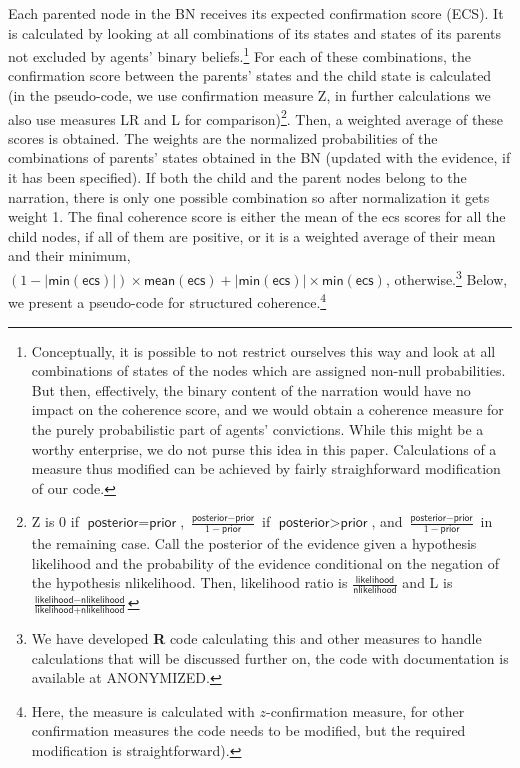 \documentclass[
  10pt,
]{scrartcl}
\newcommand{\s}[1]{\textsf{#1}}
\begin{document}
Each parented node in the BN receives its expected confirmation score (\s{ECS}). It is calculated by looking at all combinations of its states and states of its parents not excluded by agents' binary beliefs.\footnote{Conceptually, it is possible to not restrict ourselves this way and look at all combinations of states of the nodes which are assigned non-null probabilities. But then, effectively, the binary content of the narration would have no impact on the coherence score, and we would obtain a coherence measure for the purely probabilistic part of agents' convictions. While this might be a worthy enterprise, we do not purse this idea in this paper. Calculations of a measure thus modified can be achieved by fairly straighforward modification of our code.} For each of these combinations, the confirmation score between the parents' states and the child state is calculated (in the pseudo-code, we use confirmation measure \s{Z}, in further calculations we also use measures \s{LR} and \s{L} for comparison)\footnote{\s{Z} is \(0\) if \(\s{posterior} = \s{prior}\), \(\frac{\s{posterior} - \s{prior}}{1 - \s{prior}}\) if \({\s{posterior} > \s{prior}}\), and \(\frac{\s{posterior} - \s{prior}}{1 - \s{prior}}\) in the remaining case. Call the posterior of the evidence given a hypothesis \s{likelihood} and the probability of the evidence conditional on the negation of the hypothesis \s{nlikelihood}. Then, likelihood ratio is
  \(\frac{\s{likelihood}}{\s{nlikelihood}}\) and \s{L} is \(\frac{\s{likelihood} - \s{nlikelihood}}{\s{likelihood} + \s{nlikelihood}}\)}. Then, a weighted average of these scores is obtained. The weights are the normalized probabilities of the combinations of parents' states obtained in the BN (updated with the evidence, if it has been specified). If both the child and the parent nodes belong to the narration, there is only one possible combination so after normalization it gets weight 1. The final coherence score is either the mean of the \s{ecs} scores for all the child nodes, if all of them are positive, or it is a weighted average of their mean and their minimum, \((1- |\s{min}(\s{ecs})|) \times \s{mean}(\s{ecs}) + |\s{min}(\s{ecs})| \times \s{min}(\s{ecs})\), otherwise.\footnote{We have developed \textbf{\textsf{R}} code calculating this and other measures to handle calculations that will be discussed further on, the code with documentation is available at ANONYMIZED.} Below, we present a pseudo-code for structured coherence.\footnote{Here, the measure is calculated with \(z\)-confirmation measure, for other confirmation measures the code needs to be modified, but the required modification is straightforward).}
\end{document}
